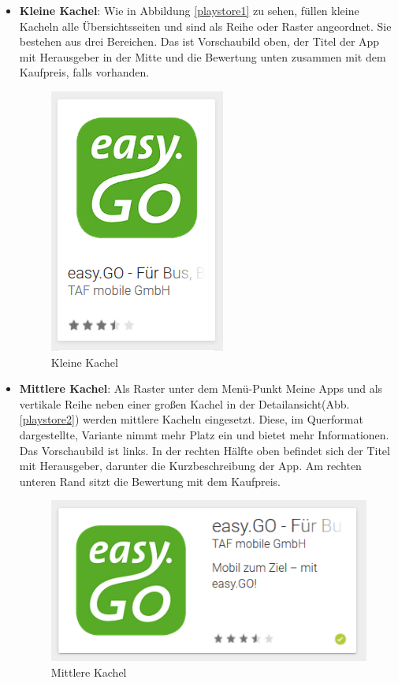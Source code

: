 \begin{itemize}
	\item \textbf{Kleine Kachel}:	
	Wie in Abbildung \ref{playstore1} zu sehen, füllen kleine Kacheln alle Übersichtsseiten und sind als Reihe oder Raster angeordnet. Sie bestehen aus drei Bereichen. Das ist Vorschaubild oben, der Titel der App mit Herausgeber in der Mitte und die Bewertung unten zusammen mit dem Kaufpreis, falls vorhanden.
	
	\begin{figure}[ht]
		\centering
		\includegraphics{pics/kachel1.png}
		\caption{Kleine Kachel}
		\label{kachel1}
	\end{figure}

	\item \textbf{Mittlere Kachel}:
	Als Raster unter dem Menü-Punkt \glqq Meine Apps\grqq{} und als vertikale Reihe neben einer großen Kachel in der Detailansicht(Abb. \ref{playstore2}) werden mittlere Kacheln eingesetzt. Diese, im Querformat dargestellte, Variante nimmt mehr Platz ein und bietet mehr Informationen.
	Das Vorschaubild ist links. In der rechten Hälfte oben befindet sich der Titel mit Herausgeber, darunter die Kurzbeschreibung der App. Am rechten unteren Rand sitzt die Bewertung mit dem Kaufpreis.
	
	\begin{figure}[ht]
		\centering
		\includegraphics{pics/kachel2.png}
		\caption{Mittlere Kachel}
		\label{kachel2}
	\end{figure}


\end{itemize}
